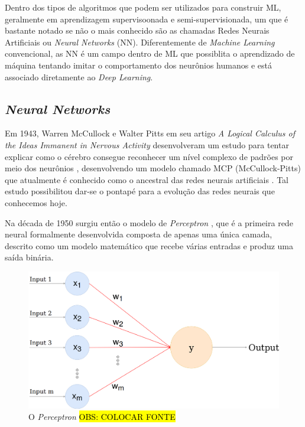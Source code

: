 Dentro dos tipos de algoritmos que podem ser utilizados para construir ML, geralmente em aprendizagem supervisoonada e semi-supervisionada, um que é bastante notado se não o mais conhecido são as chamadas Redes Neurais Artificiais ou \textit{Neural Networks} (NN). Diferentemente de \textit{Machine Learning} convencional, as NN é um campo dentro de ML que possiblita o aprendizado de máquina tentando imitar o comportamento dos neurônios humanos \cite{neural-net-history} e está associado diretamente ao \textit{Deep Learning}.

\subsection{\textit{Neural Networks}}

Em 1943, Warren McCullock e Walter Pitts em seu artigo \textit{A Logical Calculus of the Ideas Immanent in Nervous Activity} desenvolveram um estudo para tentar explicar como o cérebro consegue reconhecer um nível complexo de padrões por meio dos neurônios \cite{first-neuron-study}, desenvolvendo um modelo chamado MCP (McCullock-Pitts) que atualmente é conhecido como o ancestral das redes neurais artificiais \cite{dl-brief-review}. Tal estudo possibilitou dar-se o pontapé para a evolução das redes neurais que conhecemos hoje.

Na década de 1950 surgiu então o modelo de \textit{Perceptron} \cite{perceptron}, que é a primeira rede neural formalmente desenvolvida composta de apenas uma única camada, descrito como um modelo matemático que recebe várias entradas e produz uma saída binária.


\begin{figure}[h]
  \includegraphics[width=13cm, center]{figuras/perceptron}
  \caption{O \textit{Perceptron} \hl{OBS: COLOCAR FONTE}}
  \label{fig:perceptron}
\end{figure}

